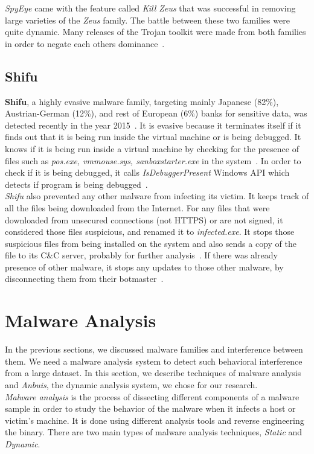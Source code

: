 \textit{SpyEye} came with the feature called \emph{Kill Zeus} that was successful in removing large varieties of the \emph{Zeus} family.
The battle between these two families were quite dynamic.
Many releases of the Trojan toolkit were made from both families in order to negate each others dominance~\cite[]{sanszeus}.
\subsection{Shifu}
\label{sub:Shifu}
\textbf{Shifu}, a highly evasive malware family, targeting mainly Japanese (82\%), Austrian-German (12\%), and rest of European (6\%) banks for sensitive data, was detected recently in the year 2015~\cite[]{secintelshifu}.
It is evasive because it terminates itself if it finds out that it is being run inside the virtual machine or is being debugged.
It knows if it is being run inside a virtual machine by checking for the presence of files such as \emph{pos.exe, vmmouse.sys, sanboxstarter.exe} in the system~\cite[]{mccafeshifu}.
In order to check if it is being debugged, it calls \emph{IsDebuggerPresent} Windows API which detects if program is being debugged~\cite[]{mccafeshifu}.\\
\emph{Shifu} also prevented any other malware from infecting its victim.
It keeps track of all the files being downloaded from the Internet.
For any files that were downloaded from unsecured connections (not HTTPS) or are not signed, it considered those files suspicious, and renamed it to \emph{infected.exe}.
It stops those suspicious files from being installed on the system and also sends a copy of the file to its C\&C server, probably for further analysis~\cite[]{secintelshifu}.
If there was already presence of other malware, it stops any updates to those other malware, by disconnecting them from their botmaster~\cite[]{secintelshifu}.
\section{Malware Analysis}
\label{sec:Malware Analysis}
In the previous sections, we discussed malware families and interference between them.
We need a malware analysis system to detect such behavioral interference from a large dataset.
In this section, we describe techniques of malware analysis and \emph{Anbuis}, the dynamic analysis system, we chose for our research.\\

\emph{Malware analysis} is the process of dissecting different components of a malware sample in order to study the behavior of the malware when it infects a host or victim's machine.
It is done using different analysis tools and reverse engineering the binary.
There are two main types of malware analysis techniques, \emph{Static} and \emph{Dynamic}.\\


